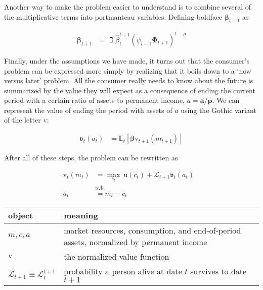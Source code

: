 \documentclass{article}
\newcommand{\CRRA}{\rho}
\newcommand{\uFunc}{\mathrm{u}}
\newcommand{\pLvl}{\mathbf{p}}
\newcommand{\DiscFac}{\beta}
\newcommand{\vFunc}{\mathrm{v}}
\newcommand{\Alive}{\mathcal{L}}
\newcommand{\Ex}{\mathbb{E}}
\newcommand{\permGroFac}{\Gamma}
\newcommand{\permShk}{\psi}
\newcommand{\tranShkEmp}{\xi}
\newcommand{\cNrm}{c}
\newcommand{\PermGroFac}{\pmb{\Phi}}
\newcommand{\Rfree}{\mathsf{R}}
\newcommand{\RNrm}{\mathcal{R}}
\newcommand{\aLvl}{\mathbf{a}}
\newcommand{\aNrm}{a}
\newcommand{\mNrm}{m}
\begin{document}
Another way to make the problem easier to understand is to combine several of the multiplicative terms into portmanteau variables. Defining boldface $\pmb{\DiscFac}_{t+1}$ as

\begin{equation}
\begin{align}
    \pmb{\DiscFac}_{t+1} & = \beth \hat{\beta}_{t}^{t+1} (\permShk_{t+1} \PermGroFac_{t+1})^{1-\CRRA}
\end{align}
\end{equation}


Finally, under the assumptions we have made, it turns out that the consumer's problem can be expressed more simply by realizing that it boils down to a `now versus later' problem.
All the consumer really needs to know about the future is summarized by the value they will expect as a consequence of ending the current period with a certain ratio of assets to permanent income, $\aNrm = \aLvl/\pLvl$. We can represent the value of ending the period with assets of $\aNrm$ using the Gothic variant of the letter $\vFunc$:

\begin{equation}
\begin{align}
    \mathfrak{v}_{t}(\aNrm_{t}) & = \Ex_{t}[\pmb{\DiscFac}\vFunc_{t+1}(\mNrm_{t+1})]
\end{align}
\end{equation}

After all of these steps, the problem can be rewritten as

\begin{equation}
\begin{align}
    {\vFunc}_{t}({\mNrm}_{t}) & = \max_{\cNrm_{t}} ~ \uFunc(\cNrm_{t})+\Alive_{t+1} \mathfrak{v}_{t}(\aNrm_{t})
    \\ & \text{s.t.} &
    \\ \aNrm_{t} & = {\mNrm}_{t}-\cNrm_{t}
\end{align}
\end{equation}

\bigskip\noindent
\begin{tabular}{p{}p{}}
\toprule
object & meaning \\
\hline
$\mNrm, \cNrm, \aNrm$ & market resources, consumption, and end-of-period assets, normalized by permanent income \\
$\vFunc$ & the normalized value function \\
$\Alive_{t+1} \equiv \Alive_{t}^{t+1}$ & probability a person alive at date $t$ survives to date $t+1$ \\
\bottomrule
\end{tabular}
\end{document}

